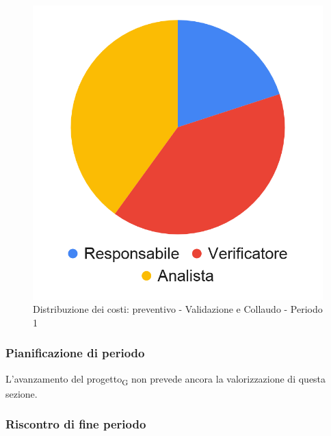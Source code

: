 \hspace{-1cm}
\begin{minipage}{.50\textwidth}
\smallPreventivoTable{
	
}
\end{minipage}
\hspace{1cm}
\begin{minipage}{.40\textwidth}
\begin{figure}[H]
	\includegraphics[scale=0.21]{res/images/charts/preventivo_priori/Grafico4-9.png}
	\caption{Distribuzione dei costi: preventivo - Validazione e Collaudo - Periodo 1}
\end{figure}
\end{minipage} 





\subsubsection{Pianificazione di periodo}

L'avanzamento del progetto\textsubscript{G} non prevede ancora la valorizzazione di questa sezione.



\subsubsection{Riscontro di fine periodo}


